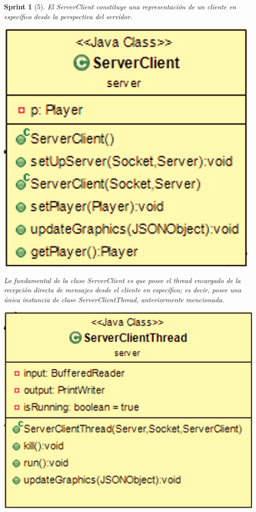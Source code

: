 \documentclass[12pt,a4paper,openright]{book}
\theoremstyle{break}
\newtheorem*{sprint}{Sprint}
\begin{document}
\begin{sprint}[5]
El ServerClient constituye una representación de un cliente en específico desde la perspectiva del servidor. 

\begin{center}
\includegraphics[scale=0.3]{ServerClient-sprint5.png} 
\end{center}

Lo fundamental de la clase ServerClient es que posee el thread encargado de la recepción directa de mensajes desde el cliente en específico; es decir, posee una única instancia de clase ServerClientThread, anteriormente mencionada.

\begin{center}
\includegraphics[scale=0.3]{ServerClientThread-sprint5.png} 
\end{center}


\end{sprint}
\end{document}

